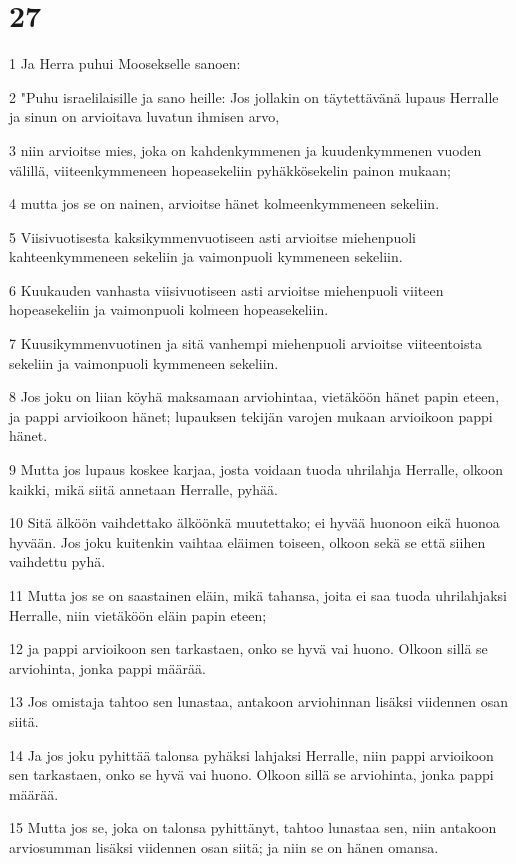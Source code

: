 \chapter{27}

\par 1 Ja Herra puhui Moosekselle sanoen:
\par 2 "Puhu israelilaisille ja sano heille: Jos jollakin on täytettävänä lupaus Herralle ja sinun on arvioitava luvatun ihmisen arvo,
\par 3 niin arvioitse mies, joka on kahdenkymmenen ja kuudenkymmenen vuoden välillä, viiteenkymmeneen hopeasekeliin pyhäkkösekelin painon mukaan;
\par 4 mutta jos se on nainen, arvioitse hänet kolmeenkymmeneen sekeliin.
\par 5 Viisivuotisesta kaksikymmenvuotiseen asti arvioitse miehenpuoli kahteenkymmeneen sekeliin ja vaimonpuoli kymmeneen sekeliin.
\par 6 Kuukauden vanhasta viisivuotiseen asti arvioitse miehenpuoli viiteen hopeasekeliin ja vaimonpuoli kolmeen hopeasekeliin.
\par 7 Kuusikymmenvuotinen ja sitä vanhempi miehenpuoli arvioitse viiteentoista sekeliin ja vaimonpuoli kymmeneen sekeliin.
\par 8 Jos joku on liian köyhä maksamaan arviohintaa, vietäköön hänet papin eteen, ja pappi arvioikoon hänet; lupauksen tekijän varojen mukaan arvioikoon pappi hänet.
\par 9 Mutta jos lupaus koskee karjaa, josta voidaan tuoda uhrilahja Herralle, olkoon kaikki, mikä siitä annetaan Herralle, pyhää.
\par 10 Sitä älköön vaihdettako älköönkä muutettako; ei hyvää huonoon eikä huonoa hyvään. Jos joku kuitenkin vaihtaa eläimen toiseen, olkoon sekä se että siihen vaihdettu pyhä.
\par 11 Mutta jos se on saastainen eläin, mikä tahansa, joita ei saa tuoda uhrilahjaksi Herralle, niin vietäköön eläin papin eteen;
\par 12 ja pappi arvioikoon sen tarkastaen, onko se hyvä vai huono. Olkoon sillä se arviohinta, jonka pappi määrää.
\par 13 Jos omistaja tahtoo sen lunastaa, antakoon arviohinnan lisäksi viidennen osan siitä.
\par 14 Ja jos joku pyhittää talonsa pyhäksi lahjaksi Herralle, niin pappi arvioikoon sen tarkastaen, onko se hyvä vai huono. Olkoon sillä se arviohinta, jonka pappi määrää.
\par 15 Mutta jos se, joka on talonsa pyhittänyt, tahtoo lunastaa sen, niin antakoon arviosumman lisäksi viidennen osan siitä; ja niin se on hänen omansa.
